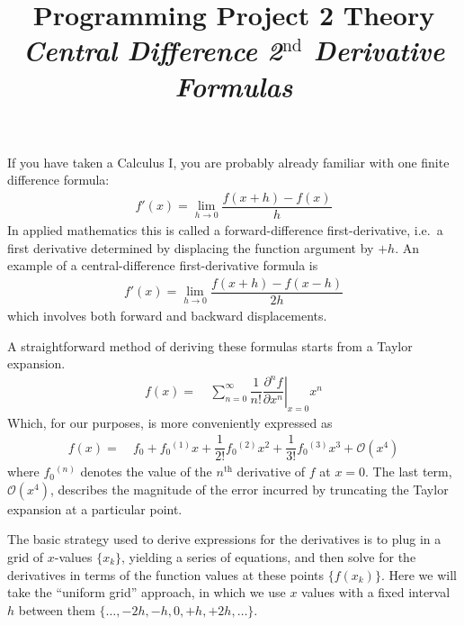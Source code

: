 \documentclass[11pt]{article}
\title{Programming Project 2 Theory\\
\textit{Central Difference 2$^\text{nd}$ Derivative Formulas}}
\date{}
\author{}
\newcommand{\fr}[2]{\dfrac{#1}{#2}}
\newcommand{\ord}[1]{\ensuremath{^{(#1)}}}
\newcommand{\pd}[3]{\ensuremath{ \dfrac{ \partial^{#1} #2 }{\partial #3 ^{#1}}}}
\newcommand{\bigo}{\ensuremath{\mathcal{O}}}
\newcommand{\eth}{\ensuremath{^\text{th}}}
\newcommand{\ld}{\ensuremath{\ldots}}
\begin{document}
\maketitle
\vspace{-1cm}

\noindent
If you have taken a Calculus I, you are probably already familiar with
one finite difference formula:
\begin{align*}
    f'(x) = \lim_{h\rightarrow0} \fr{f(x+h)-f(x)}{h}
\end{align*}
In applied mathematics this is called a
forward-difference first-derivative, i.e.~a first derivative determined by
displacing the function argument by $+h$. An example of a central-difference
first-derivative formula is
\begin{align*}
    f'(x) = \lim_{h\rightarrow0} \fr{f(x+h)-f(x-h)}{2h} 
\end{align*}
which involves both forward and backward displacements.

A straightforward method of deriving these formulas starts from a
Taylor expansion.
\begin{align}
    f(x) 
    =&\
    \sum_{n=0}^\infty \fr{1}{n!}
    \left.\pd{n}{f}{x}\right|_{x=0} x^n
\end{align}
Which, for our purposes, is more conveniently expressed as
\begin{align}
    f(x) =&\
      f_0 + f_0\ord{1}x + \fr{1}{2!}f_0\ord{2}x^2
      + \fr{1}{3!}f_0\ord{3}x^3 + \bigo(x^4)
\end{align}
where $f_0\ord{n}$ denotes the value of the $n\eth$ derivative of $f$ at $x=0$.
The last term, $\bigo(x^4)$, describes the magnitude of the error incurred by
truncating the Taylor expansion at a particular point.

The basic strategy used to derive expressions for the derivatives is to plug in a grid of $x$-values $\{x_k\}$, yielding a series of equations, and then solve
for the derivatives in terms of the function values at these points
$\{f(x_k)\}$. Here we will take the ``uniform grid'' approach, in which we use
$x$ values with a fixed interval $h$ between them
$\{\ld,-2h,-h,0,+h,+2h,\ld\}$.
\end{document}
